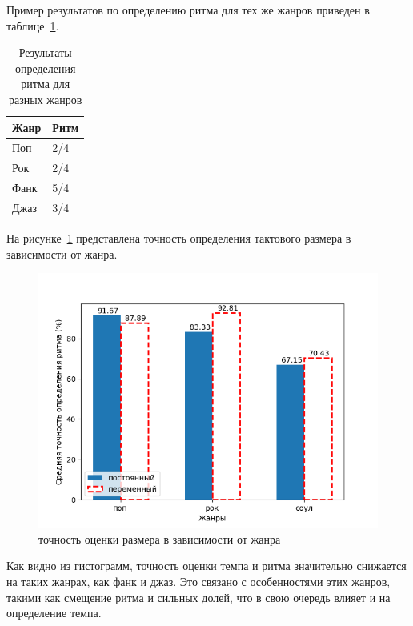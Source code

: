 \newpage

Пример результатов по определению ритма для тех же жанров приведен в таблице~\ref{tab:rhythm_genres}.

\begin{table}[!h]
	\begin{center}
		\caption{\label{tab:rhythm_genres}Результаты определения ритма для разных жанров}
		\begin{tabular}{|p{8cm}|p{8cm}|}
			\hline
			\textbf{Жанр} & \textbf{Ритм}\\
			\hline
			Поп & 2/4\\
			\hline
			Рок & 2/4\\
			\hline
			Фанк & 5/4\\
			\hline
			Джаз & 3/4\\
			\hline
		\end{tabular}
	\end{center}
\end{table}

На рисунке~\ref{img:measure_genres} представлена точность определения тактового размера в зависимости от жанра.

\begin{figure}[h]
	\centering
	\includegraphics[scale=1]{../graphs/measure_genres.png}
	\caption{точность оценки размера в зависимости от жанра}
	\label{img:measure_genres}
\end{figure}

\newpage

Как видно из гистограмм, точность оценки темпа и ритма значительно снижается на таких жанрах, как фанк и джаз. Это связано с особенностями этих жанров, такими как смещение ритма и сильных долей, что в свою очередь влияет и на определение темпа.

